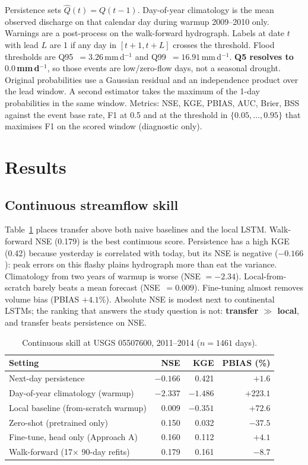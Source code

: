 \documentclass[11pt,letterpaper]{article}
\begin{document}
Persistence sets $\hat Q(t)=Q(t-1)$. Day-of-year climatology is the mean
observed discharge on that calendar day during warmup 2009--2010 only.
Warnings are a post-process on the walk-forward hydrograph. Labels at date $t$
with lead $L$ are 1 if any day in $[t+1,t+L]$ crosses the threshold. Flood
thresholds are Q95~$=3.26$\,mm\,d$^{-1}$ and Q99~$=16.91$\,mm\,d$^{-1}$.
\textbf{Q5 resolves to $0.0$\,mm\,d$^{-1}$}, so those events are low/zero-flow
days, not a seasonal drought. Original probabilities use a Gaussian residual
and an independence product over the lead window. A second estimator takes the
maximum of the 1-day probabilities in the same window. Metrics: NSE, KGE,
PBIAS, AUC, Brier, BSS against the event base rate, F1 at 0.5 and at the
threshold in $\{0.05,\ldots,0.95\}$ that maximises F1 on the scored window
(diagnostic only).

\section{Results}

\subsection{Continuous streamflow skill}

Table~\ref{tab:midwest_metrics} places transfer above both naive baselines and
the local LSTM. Walk-forward NSE (0.179) is the best continuous score.
Persistence has a high KGE (0.42) because yesterday is correlated with today,
but its NSE is negative ($-0.166$): peak errors on this flashy plains
hydrograph more than eat the variance. Climatology from two years of warmup is
worse (NSE $=-2.34$). Local-from-scratch barely beats a mean forecast
(NSE~$=0.009$). Fine-tuning almost removes volume bias (PBIAS $+4.1\%$).
Absolute NSE is modest next to continental LSTMs; the ranking that answers the
study question is not: \textbf{transfer $\gg$ local}, and transfer beats
persistence on NSE.

\begin{table}[ht]
  \centering
  \caption{Continuous skill at USGS 05507600, 2011--2014 ($n=1461$ days).}
  \label{tab:midwest_metrics}
  \small
  \begin{tabular}{@{}lrrr@{}}
    \toprule
    \textbf{Setting} & \textbf{NSE} & \textbf{KGE} & \textbf{PBIAS (\%)} \\
    \midrule
    Next-day persistence & $-0.166$ & 0.421 & $+1.6$ \\
    Day-of-year climatology (warmup) & $-2.337$ & $-1.486$ & $+223.1$ \\
    Local baseline (from-scratch warmup) & 0.009 & $-0.351$ & $+72.6$ \\
    Zero-shot (pretrained only) & 0.150 & 0.032 & $-37.5$ \\
    Fine-tune, head only (Approach A) & 0.160 & 0.112 & $+4.1$ \\
    Walk-forward (17$\times$ 90-day refits) & 0.179 & 0.161 & $-8.7$ \\
    \bottomrule
  \end{tabular}
\end{table}
\end{document}

